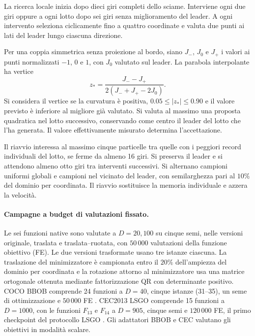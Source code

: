 La ricerca locale inizia dopo dieci giri completi dello sciame. Interviene ogni due giri oppure a ogni lotto dopo sei giri senza miglioramento del leader. A ogni intervento seleziona ciclicamente fino a quattro coordinate e valuta due punti ai lati del leader lungo ciascuna direzione.

Per una coppia simmetrica senza proiezione al bordo, siano $J_-$, $J_0$ e $J_+$ i valori ai punti normalizzati $-1$, $0$ e $1$, con $J_0$ valutato sul leader. La parabola interpolante ha vertice
\[
 z_* = \frac{J_- - J_+}{2(J_-+J_+-2J_0)}.
\]
Si considera il vertice se la curvatura è positiva, $0.05\leq |z_*|\leq0.90$ e il valore previsto è inferiore al migliore già valutato. Si valuta al massimo una proposta quadratica nel lotto successivo, conservando come centro il leader del lotto che l'ha generata. Il valore effettivamente misurato determina l'accettazione.

Il riavvio interessa al massimo cinque particelle tra quelle con i peggiori record individuali del lotto, se ferme da almeno 16 giri. Si preserva il leader e si attendono almeno otto giri tra interventi successivi. Si alternano campioni uniformi globali e campioni nel vicinato del leader, con semilarghezza pari al $10\%$ del dominio per coordinata. Il riavvio sostituisce la memoria individuale e azzera la velocità.

\paragraph{Campagne a budget di valutazioni fissato.}
Le sei funzioni native sono valutate a $D=20,100$ su cinque semi, nelle versioni originale, traslata e traslata--ruotata, con $50\,000$ valutazioni della funzione obiettivo (FE). Le due versioni trasformate usano tre istanze ciascuna. La traslazione del minimizzatore è campionata entro il $20\%$ dell'ampiezza del dominio per coordinata e la rotazione attorno al minimizzatore usa una matrice ortogonale ottenuta mediante fattorizzazione QR con determinante positivo. COCO BBOB comprende 24 funzioni a $D=40$, cinque istanze (31--35), un seme di ottimizzazione e $50\,000$ FE \citep{Hansen2021,Hansen2016Procedure}. CEC2013 LSGO comprende 15 funzioni a $D=1000$, con le funzioni $F_{13}$ e $F_{14}$ a $D=905$, cinque semi e $120\,000$ FE, il primo checkpoint del protocollo LSGO \citep{Li2013}. Gli adattatori BBOB e CEC valutano gli obiettivi in modalità scalare.

